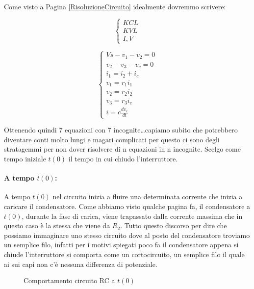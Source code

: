 Come visto a Pagina \ref{RisoluzioneCircuito} idealmente dovremmo scrivere:

$$
\begin{cases}
    KCL\\
    KVL\\
    I,V
\end{cases}
$$

$$
\begin{cases}
    Vs - v_1 - v_2 = 0\\
    v_2-v_3-v_c=0\\
    i_1=i_2+i_c\\
    v_1 = r_1i_1\\
    v_2 = r_2i_2\\
    v_3 = r_3i_c\\
    i = c\frac{dv_c}{dt}
\end{cases}
$$

Ottenendo quindi 7 equazioni con 7 incognite\dots capiamo subito che potrebbero diventare conti molto lungi e magari complicati per questo ci sono degli stratagemmi per non dover risolvere di n equazioni in n incognite.
Scelgo come tempo iniziale $t(0)$ il tempo in cui chiudo l'interruttore.

\paragraph{A tempo $t(0)$:\\}

A tempo $t(0)$ nel circuito inizia a fluire una determinata corrente che inizia a caricare il condensatore. Come abbiamo visto qualche pagina fa, il condensatore a $t(0)$, durante la fase di carica, viene trapassato dalla corrente massima che in questo caso è la stessa che viene da $R_2$. Tutto questo discorso per dire che possiamo immaginare uno stesso circuito dove al posto del condensatore troviamo un semplice filo, infatti per i motivi spiegati poco fa il condensatore appena si chiude l'interruttore si comporta come un cortocircuito, un semplice filo il quale ai sui capi non c'è nessuna differenza di potenziale.

\begin{figure}[H]
    \centering
    \caption{Comportamento circuito RC a $t(0)$}
    \label{fig:circuitoRCtzero}
\end{figure}

